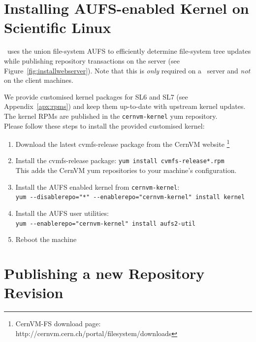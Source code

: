 \pagebreak

\section{Installing AUFS-enabled Kernel on Scientific Linux}
\label{sct:customkernelinstall}
\cvmfs\ uses the union file-system AUFS \cite{aufs} to efficiently determine file-system tree updates while publishing repository transactions on the server (see Figure~\ref{fig:installwebserver}).
Note that this is \emph{only} required on a \cvmfs\ server and \emph{not} on the client machines.

We provide customised kernel packages for SL6 and SL7 (see Appendix~\ref{apx:rpms}) and keep them up-to-date with upstream kernel updates.
The kernel RPMs are published in the \texttt{cernvm-kernel} yum repository. \\

\noindent Please follow these steps to install the provided customised kernel:
\begin{enumerate}
\item Download the latest cvmfs-release package from the CernVM website \footnote{CernVM-FS download page: http://cernvm.cern.ch/portal/filesystem/downloads}
\item Install the cvmfs-release package: \texttt{yum install cvmfs-release*.rpm} \\
This adds the CernVM yum repositories to your machine's configuration.
\item Install the AUFS enabled kernel from \texttt{cernvm-kernel}: \\
\texttt{yum -\--disablerepo="*" -\--enablerepo="cernvm-kernel" install kernel}
\item Install the AUFS user utilities: \\
\texttt{yum -\--enablerepo="cernvm-kernel" install aufs2-util}
\item Reboot the machine
\end{enumerate}

\section{Publishing a new Repository Revision}
\label{sct:repoupdate}

